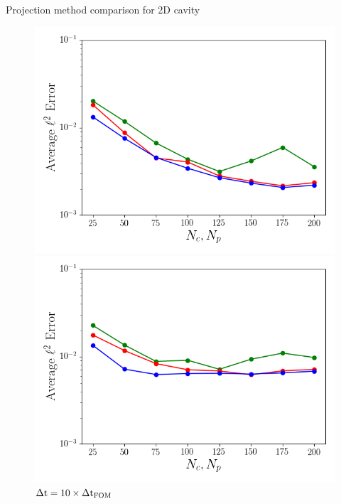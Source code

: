 \documentclass[]{beamer}
\begin{document}
\begin{frame}[noframenumbering]{Projection method comparison for 2D cavity}
\begin{figure}
		\begin{minipage}{0.35\linewidth}
			\includegraphics[width=0.99\linewidth]{Images/experiments/2d_cavity/backup/unsampled_dt5e-6_Average_errorRaw.png}
			\caption*{\scriptsize{$\dt = 5 \times \dtFOM$}}
		\end{minipage}
		\begin{minipage}{0.35\linewidth}
			\includegraphics[width=0.99\linewidth]{Images/experiments/2d_cavity/backup/unsampled_dt1e-5_Average_errorRaw.png}
			\caption*{\scriptsize{$\Delta \text{t} = 10 \times \Delta \text{t}_{\text{FOM}}$}}
		\end{minipage}
	\end{figure}
\end{frame}
\end{document}
